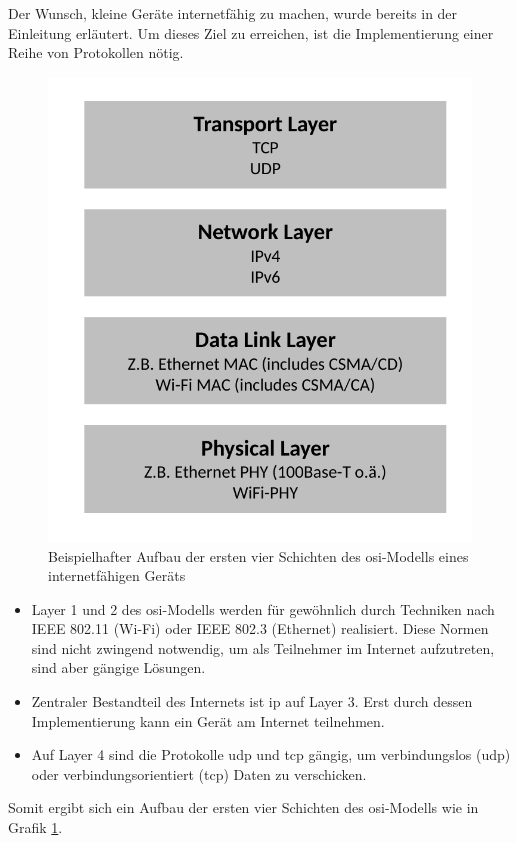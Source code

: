 Der Wunsch, kleine Geräte internetfähig zu machen, wurde bereits in der Einleitung erläutert. Um dieses Ziel zu erreichen, ist die Implementierung einer Reihe von Protokollen nötig.
\begin{figure}
	\centering
	\includegraphics[width=\textwidth/2]{Grafiken-Alex/internet-osi.pdf}
	\caption{Beispielhafter Aufbau der ersten vier Schichten des \ac{osi}-Modells eines internetfähigen Geräts}
	\label{internet-osi}
\end{figure}
\begin{itemize}
	\item Layer 1 und 2 des \ac{osi}-Modells werden für gewöhnlich durch Techniken nach IEEE 802.11 (Wi-Fi) oder IEEE 802.3 (Ethernet) realisiert. Diese Normen sind nicht zwingend notwendig, um als Teilnehmer im Internet aufzutreten, sind aber gängige Lösungen.
	\item Zentraler Bestandteil des Internets ist \ac{ip} auf Layer 3. Erst durch dessen Implementierung kann ein Gerät am Internet teilnehmen.
	\item Auf Layer 4 sind die Protokolle \ac{udp} und \ac{tcp} gängig, um verbindungslos (\ac{udp}) oder verbindungsorientiert (\ac{tcp}) Daten zu verschicken.
\end{itemize}
Somit ergibt sich ein Aufbau der ersten vier Schichten des \ac{osi}-Modells wie in Grafik \ref{internet-osi}. 


